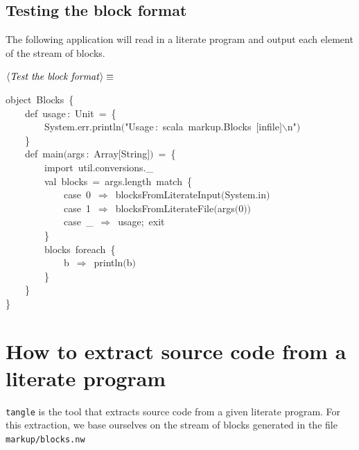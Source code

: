 \documentclass[a4paper,12pt]{article}
\begin{document}
\subsection{Testing the block format}
The following application will read in a literate program and output
each element of the stream of blocks.

$\left<\mbox{\emph{Test the block format}}\right>\equiv$
\begin{program}{\vem object}~Blocks~{\small\{}
\\~~~~{\vem def}~usage\,{\rm :}~Unit~=~{\small\{}
\\~~~~~~~~System.err.println$($"Usage\,{\rm :}~scala~markup.Blocks~$[$infile$]$$\backslash$n"$)$
\\~~~~{\small\}}
\\[0.5em]~~~~{\vem def}~main$($args\,{\rm :}~Array$[$String$]$$)$~=~{\small\{}
\\~~~~~~~~{\vem import}~util.conversions.\_
\\[0.5em]~~~~~~~~{\vem val}~blocks~=~args.length~{\vem match}~{\small\{}
\\~~~~~~~~~~~~{\vem case}~0~$\Rightarrow$~blocksFromLiterateInput$($System.in$)$
\\~~~~~~~~~~~~{\vem case}~1~$\Rightarrow$~blocksFromLiterateFile$($args$($0$)$$)$
\\~~~~~~~~~~~~{\vem case}~\_~$\Rightarrow$~usage;~exit
\\~~~~~~~~{\small\}}
\\[0.5em]~~~~~~~~blocks~foreach~{\small\{}
\\~~~~~~~~~~~~b~$\Rightarrow$~println$($b$)$
\\~~~~~~~~{\small\}}
\\~~~~{\small\}}
\\{\small\}}
\end{program}
\section{How to extract source code from a literate program}
\texttt{tangle} is the tool that extracts source code from a given literate
program. For this extraction, we base ourselves on the stream of blocks
generated in the file \texttt{markup/blocks.nw}
\end{document}
